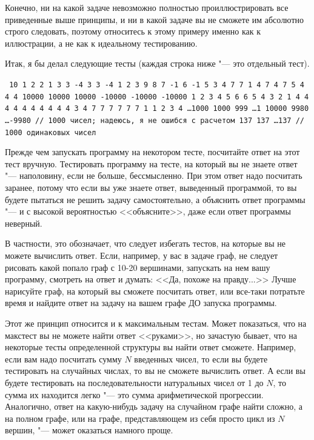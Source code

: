 \documentclass[a4paper,10pt]{problems}
\begin{document}
Конечно, ни на какой задаче невозможно полностью проиллюстрировать все приведенные выше принципы, и ни в какой задаче вы не сможете 
им абсолютно строго следовать, поэтому относитесь к этому примеру именно как к иллюстрации, а не как к идеальному тестированию.

Итак, я бы делал следующие тесты (каждая строка ниже "--- это отдельный тест).

{\noindent\tt{}
10
1 2
2 1
3 3
-4 3
3 -4
1 2 3
9 8 7
-1 6 -1
5 3 4
7 7 1
4 7 4 7
5 4 4 4
10000 10000 10000 -10000 -10000 -10000
1 2 3 4 5 6
6 5 4 3 2 1
4 4 4 4 4 4
4 4 4 4 3 4
7 7 7 7 7 7 1
1 2 3 4 \dots 1000
1000 999 \dots 1
10000 9980 \dots -9980 // 1000 чисел; надеюсь, я не ошибся с расчетом
137 137 \dots 137 // 1000 одинаковых чисел
}


 Прежде чем запускать программу на некотором тесте, посчитайте ответ на этот тест вручную. 
Тестировать программу на тесте, на который вы не знаете ответ "--- наполовину, если не больше, бессмысленно.
При этом ответ надо посчитать заранее, потому что если вы уже знаете ответ, выведенный программой, 
то вы будете пытаться не решить задачу самостоятельно, а объяснить ответ программы "--- и с высокой вероятностью <<объясните>>, 
даже если ответ программы неверный.

В частности, это обозначает, что следует избегать тестов, на которые вы не можете вычислить ответ. 
Если, например, у вас в задаче граф, не следует рисовать какой попало граф с 10-20 вершинами, запускать на нем вашу программу, смотреть на ответ и думать:
<<Да, похоже на правду...>> Лучше нарисуйте граф, на который вы сможете посчитать ответ, или все-таки потратьте время и найдите ответ на задачу 
на вашем графе ДО запуска программы.

Этот же принцип относится и к максимальным тестам. Может показаться, что на макстест вы не можете найти ответ <<руками>>, но зачастую бывает,
что на некоторые тесты определенной структуры вы найти ответ сможете. 
Например, если вам надо посчитать сумму $N$ введенных чисел, то если вы будете тестировать на случайных числах, то вы не сможете вычислить ответ. 
А если вы будете тестировать на последовательности натуральных чисел от 1 до $N$, то сумма их находится легко "--- это сумма арифметической прогрессии.
Аналогично, ответ на какую-нибудь задачу на случайном графе найти сложно, а на полном графе, или на графе, представляющем из себя просто цикл из $N$ вершин,
"--- может оказаться намного проще.
\end{document}
